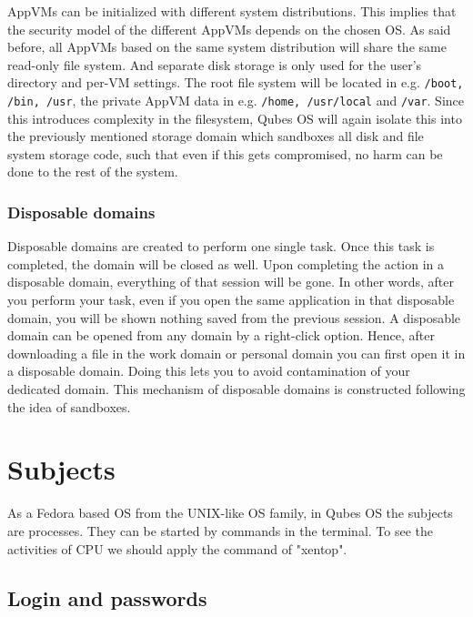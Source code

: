 \documentclass[runningheads,a4paper]{article}
\begin{document}
AppVMs can be initialized with different system
distributions. This implies that the security model of the different 
AppVMs depends on the chosen OS. As said before, all AppVMs
based on the same system distribution will share the same read-only
file system. And separate disk storage is only used for the user's
directory and per-VM settings. The root file system will be located in
e.g. \texttt{/boot, /bin, /usr}, the private AppVM data in
e.g. \texttt{/home, /usr/local} and \texttt{/var}. 
Since this introduces complexity in the
filesystem, Qubes OS will again isolate this into the previously
mentioned storage domain which sandboxes
all disk and file system storage code, such that even if this gets
compromised, no harm can be done to the rest of the system.

\subsubsection{Disposable domains}

Disposable domains are created to perform one single task. Once this
task is completed, the domain will be closed as well. Upon completing
the action in a disposable domain, everything of that session will be
gone. In other words, after you perform your task, even if you open the same application in that disposable domain, you will be shown nothing saved from the previous session. A disposable domain can be opened from any domain by a right-click option. Hence, after
downloading a file in the work domain or personal domain you can first
open it in a disposable domain. Doing this lets you to avoid contamination of your
dedicated domain. This mechanism of disposable domains is constructed
following the idea of sandboxes.


\section{Subjects}

As a Fedora based OS from the UNIX-like OS family, in Qubes OS the subjects are processes. They can be started by commands in the
terminal. To see the activities of CPU we should apply the command of
"xentop". 

\subsection{Login and passwords} 
\end{document}
